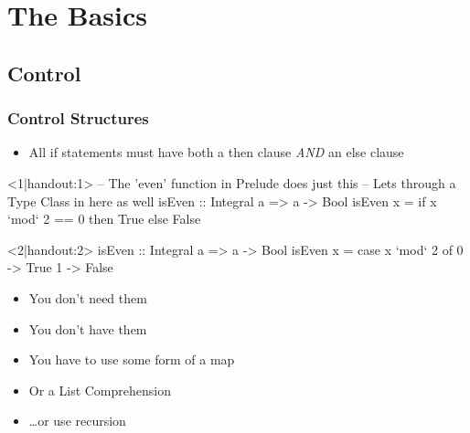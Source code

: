 \section{The Basics}
\subsection{Control}
\begin{frame}[t,fragile]
    \frametitle{Control Structures}
    \begin{overprint}
        \begin{itemize}
            \item<1|handout:1> All if statements must have both a then clause \textit{AND} an else clause
        \end{itemize}
        \begin{hscode}<1|handout:1>
            -- The 'even' function in Prelude does just this
            -- Lets through a Type Class in here as well
            isEven :: Integral a => a -> Bool
            isEven x = if x `mod` 2 == 0
                        then True
                        else False
        \end{hscode}

        \begin{hscode}<2|handout:2>
            isEven :: Integral a => a -> Bool
            isEven x = case x `mod` 2 of
                0 -> True
                1 -> False
        \end{hscode}

        \begin{itemize}
            \item<3-7|handout:3> You don't need them
            \item<4-7|handout:3> You don't have them
            \item<5-7|handout:3> You have to use some form of a map
            \item<6-7|handout:3> Or a List Comprehension
            \item<7|handout:3> \ldots or use recursion
        \end{itemize}
    \end{overprint}
\end{frame}

